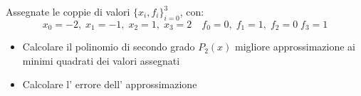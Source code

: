 Assegnate le coppie di valori $\{x_i,f_i \}_{i=0}^3$, con:
\[ x_0=-2, \; x_1=-1, \; x_2=1, \; x_3=2 \quad f_0=0, \; f_1=1, \; f_2=0 \; f_3=1 \]
\begin{itemize}
\item Calcolare il polinomio di secondo grado $P_2(x)$
migliore approssimazione ai minimi quadrati dei valori assegnati
\item Calcolare l' errore dell' approssimazione
\end {itemize}
